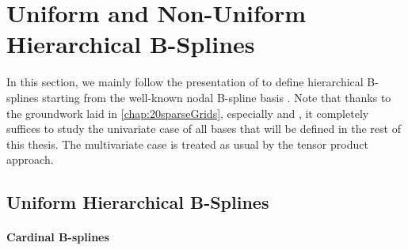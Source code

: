 \section{Uniform and Non-Uniform Hierarchical B-Splines}
\label{sec:31standardBSplines}

In this section, we mainly follow the presentation of
to define hierarchical B-splines
starting from the well-known nodal B-spline basis
.
Note that thanks to the groundwork laid in \cref{chap:20sparseGrids},
especially  and
,
it completely suffices to study the univariate case
of all bases that will be defined in the rest of this thesis.
The multivariate case is treated as usual by the tensor product approach.



\subsection{Uniform Hierarchical B-Splines}
\label{sec:311uniform}

\paragraph{Cardinal B-splines}

